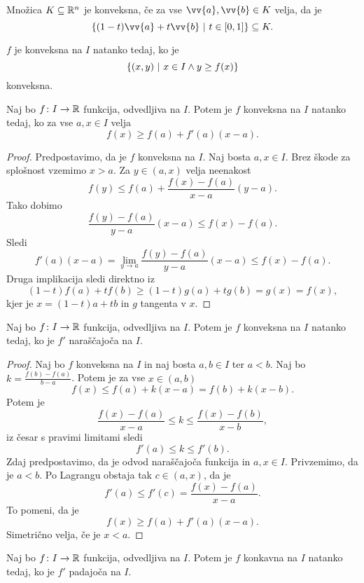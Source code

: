 \documentclass[12pt, a4paper]{article}
\begin{document}
\begin{opomba}
Množica $K\subseteq \mathbb{R}^n$ je konveksna, če za vse $\vv{a},\vv{b}\in K$ velja, da je
\[
\setb{(1-t)\vv{a}+t\vv{b}}{t\in[0,1]}\subseteq K.
\]
\end{opomba}

\begin{opomba}
$f$ je konveksna na $I$ natanko tedaj, ko je
\[
\left\{(x,y)~\middle\vert~x\in I\land y\geq f(x)\right\}
\]
konveksna.
\end{opomba}

\begin{izrek}
Naj bo $f\colon I\to\mathbb{R}$ funkcija, odvedljiva na $I$. Potem je $f$ konveksna na $I$ natanko tedaj, ko za vse $a,x\in I$ velja
\[
f(x)\geq f(a)+f'(a)(x-a).
\]
\end{izrek}

\begin{proof}
Predpostavimo, da je $f$ konveksna na $I$. Naj bosta $a,x\in I$. Brez škode za splošnost vzemimo $x>a$. Za $y\in (a,x)$ velja neenakost
\[
f(y)\leq f(a)+\frac{f(x)-f(a)}{x-a}(y-a).
\]
Tako dobimo
\[
\frac{f(y)-f(a)}{y-a}(x-a)\leq f(x)-f(a).
\]
Sledi
\[
f'(a)(x-a)=\lim_{y\to a}\frac{f(y)-f(a)}{y-a}(x-a)\leq f(x)-f(a).
\]
Druga implikacija sledi direktno iz
\[
(1-t)f(a)+tf(b)\geq (1-t)g(a)+tg(b)=g(x)=f(x),
\]
kjer je $x=(1-t)a+tb$ in $g$ tangenta v $x$.
\end{proof}

\begin{izrek}
Naj bo $f\colon I\to\mathbb{R}$ funkcija, odvedljiva na $I$. Potem je $f$ konveksna na $I$ natanko tedaj, ko je $f'$ naraščajoča na $I$.
\end{izrek}

\begin{proof}
Naj bo $f$ konveksna na $I$ in naj bosta $a,b\in I$ ter $a<b$. Naj bo $k=\frac{f(b)-f(a)}{b-a}$. Potem je za vse $x\in(a,b)$
\[
f(x)\leq f(a)+k(x-a)=f(b)+k(x-b).
\]
Potem je
\[
\frac{f(x)-f(a)}{x-a}\leq k\leq\frac{f(x)-f(b)}{x-b},
\]
iz česar s pravimi limitami sledi
\[
f'(a)\leq k\leq f'(b).
\]
Zdaj predpostavimo, da je odvod naraščajoča funkcija in $a,x\in I$. Privzemimo, da je $a<b$. Po Lagrangu obstaja tak $c\in(a,x)$, da je
\[
f'(a)\leq f'(c)=\frac{f(x)-f(a)}{x-a}.
\]
To pomeni, da je
\[
f(x)\geq f(a)+f'(a)(x-a).
\]
Simetrično velja, če je $x<a$.
\end{proof}

\begin{posledica}
Naj bo $f\colon I\to\mathbb{R}$ funkcija, odvedljiva na $I$. Potem je $f$ konkavna na $I$ natanko tedaj, ko je $f'$ padajoča na $I$.
\end{posledica}
\end{document}
